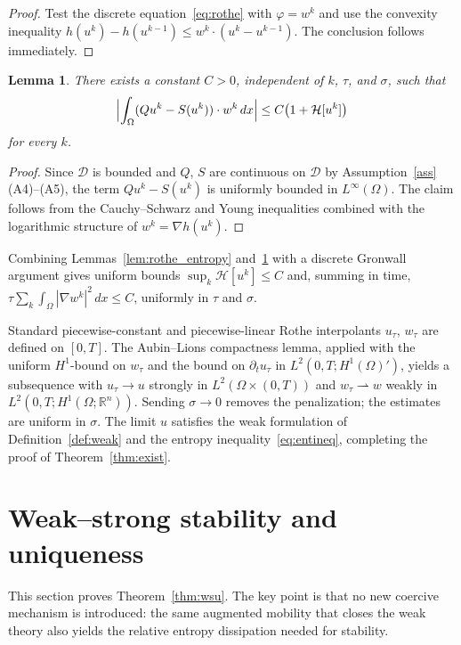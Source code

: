 \documentclass{article}
\newtheorem{lemma}[theorem]{Lemma}
\newcommand{\R}{\mathbb{R}}
\newcommand{\D}{\mathcal{D}}
\newcommand{\HH}{\mathcal{H}}         %
\begin{document}
\begin{proof}
Test the discrete equation~\eqref{eq:rothe} with $\varphi=w^k$ and use
the convexity inequality $h(u^k)-h(u^{k-1})\le w^k\cdot(u^k-u^{k-1})$.
The conclusion follows immediately.
\end{proof}

\begin{lemma}\label{lem:rothe_reaction}
There exists a constant $C>0$, independent of $k$, $\tau$, and $\sigma$,
such that
\[
  \Bigl|\int_\Omega(Qu^k-S(u^k))\cdot w^k\,dx\Bigr|
  \le C\bigl(1+\HH[u^k]\bigr)
\]
for every $k$.
\end{lemma}

\begin{proof}
Since $\D$ is bounded and $Q$, $S$ are continuous on $\D$
by Assumption~\ref{ass}(A4)--(A5), the term $Qu^k-S(u^k)$ is uniformly
bounded in $L^\infty(\Omega)$. The claim follows from the Cauchy--Schwarz
and Young inequalities combined with the logarithmic structure of
$w^k=\nabla h(u^k)$.
\end{proof}

Combining Lemmas~\ref{lem:rothe_entropy} and~\ref{lem:rothe_reaction}
with a discrete Gronwall argument gives uniform bounds
$\sup_k\HH[u^k]\le C$ and, summing in time,
$\tau\sum_k\int_\Omega|\nabla w^k|^2\,dx\le C$,
uniformly in $\tau$ and $\sigma$.

Standard piecewise-constant and piecewise-linear Rothe interpolants
$u_\tau$, $w_\tau$ are defined on $[0,T]$. The Aubin--Lions compactness
lemma, applied with the uniform $H^1$-bound on $w_\tau$ and the bound on
$\partial_t u_\tau$ in $L^2(0,T;H^1(\Omega)')$, yields a subsequence
with $u_\tau\to u$ strongly in $L^2(\Omega\times(0,T))$ and
$w_\tau\rightharpoonup w$ weakly in $L^2(0,T;H^1(\Omega;\R^n))$.
Sending $\sigma\to 0$ removes the penalization; the estimates are
uniform in $\sigma$. The limit $u$ satisfies the weak formulation of
Definition~\ref{def:weak} and the entropy inequality~\eqref{eq:entineq},
completing the proof of Theorem~\ref{thm:exist}.

\section{Weak--strong stability and uniqueness}
\label{sec:wsu}

This section proves Theorem~\ref{thm:wsu}. The key point is that no new
coercive mechanism is introduced: the same augmented mobility that closes
the weak theory also yields the relative entropy dissipation needed for
stability.
\end{document}
